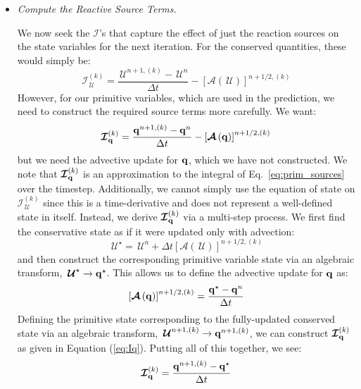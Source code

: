 \documentclass[times,modern]{aastex63}
\newcommand{\Ic}{{\boldsymbol{\mathcal{I}}}}
\newcommand{\Uc}{{\,\bm{\mathcal{U}}}}
\newcommand{\qb}{{\bf q}}
\newcommand{\Adv}[1]{{\left [\boldsymbol{\mathcal{A}} \left(#1\right)\right]}}
\begin{document}
\begin{itemize}
\begin{itemize}
  \item {\em Compute the Reactive Source Terms.}

    We now seek the $\Ic$'s that capture the effect of just the
    reaction sources on the state variables for the next iteration.
    For the conserved quantities, these would simply be:
    \begin{equation}
      \Ic^{(k)}_{\Uc} = \frac{\Uc^{n+1,(k)} - \Uc^n}{\Delta t} - \Adv{\Uc}^{n+1/2,(k)}
    \end{equation}
    However, for our primitive variables, which are used in the
    prediction, we need to construct the required source terms more
    carefully.  We want:
    \begin{equation}
      \label{eq:Iq}
      \Ic^{(k)}_{\qb} = \frac{\qb^{n+1,(k)} - \qb^n}{\Delta t} - \Adv{\qb}^{n+1/2,(k)}
    \end{equation}
    but we need the advective update for $\qb$, which we have not
    constructed.  We note that $\Ic^{(k)}_\qb$ is an approximation to the integral of 
    Eq.~\ref{eq:prim_sources} over the timestep.  Additionally, we cannot simply use the equation of
    state on $\Ic^{(k)}_{\Uc}$ since this is a time-derivative and
    does not represent a well-defined state in itself.  Instead, we
    derive $\Ic^{(k)}_{\qb}$ via a multi-step process.  We first find
    the conservative state as if it were updated only with advection:
    \begin{equation}
      \Uc^\star = \Uc^n + \Delta t \Adv{\Uc}^{n+1/2,(k)}
    \end{equation}
    and then construct the corresponding primitive variable state via an algebraic transform,
    $\Uc^\star \rightarrow \qb^\star$.
    This allows us to define the advective update for $\qb$ as:
    \begin{equation}
      \Adv{\qb}^{n+1/2,(k)} = \frac{\qb^\star - \qb^n}{\Delta t}
    \end{equation}
    Defining the primitive state corresponding to the fully-updated
    conserved state via an algebraic transform, $\Uc^{n+1,(k)}
    \rightarrow \qb^{n+1,(k)}$, we can construct $\Ic^{(k)}_{\qb}$ as given
    in Equation (\ref{eq:Iq}).
    Putting all of this together, we see:
    \begin{equation}
      \Ic^{(k)}_{\qb} = \frac{\qb^{n+1,(k)} - \qb^\star}{\Delta t}
    \end{equation}





  \end{itemize}

\end{itemize}
\end{document}
